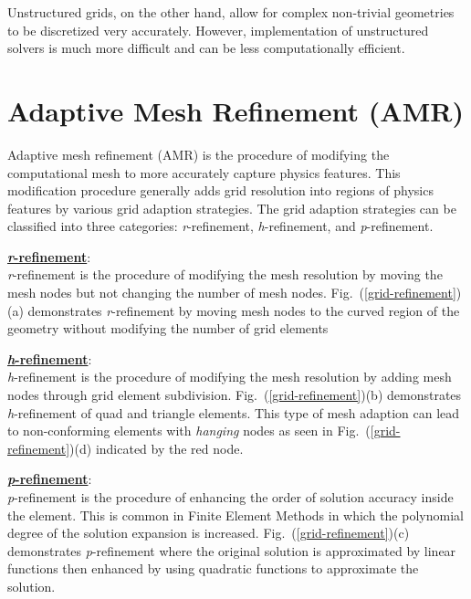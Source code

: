 \documentclass[11pt]{book}
\begin{document}
Unstructured grids, on the other hand, allow for complex non-trivial geometries to be discretized very accurately. 
However, implementation of unstructured solvers is much more difficult and can be less computationally efficient.

\newpage
\section{Adaptive Mesh Refinement (AMR)}
Adaptive mesh refinement (AMR) is the procedure of modifying the computational mesh to more accurately capture physics features.
This modification procedure generally adds grid resolution into regions of physics features by various grid adaption strategies.
The grid adaption strategies can be classified into three categories: \textit{r}-refinement, \textit{h}-refinement, and \textit{p}-refinement.
\bigskip

\noindent
\underline{\textbf{\textit{r}-refinement}}:\\
\textit{r}-refinement is the procedure of modifying the mesh resolution by moving the mesh nodes but not changing the number of mesh nodes. 
Fig.~(\ref{grid-refinement})(a) demonstrates \textit{r}-refinement by moving mesh nodes to the curved region of the geometry without modifying 
the number of grid elements
\bigskip

\noindent
\underline{\textbf{\textit{h}-refinement}}:\\
\textit{h}-refinement is the procedure of modifying the mesh resolution by adding mesh nodes through grid element subdivision.
Fig.~(\ref{grid-refinement})(b) demonstrates \textit{h}-refinement of quad and triangle elements. This type of mesh adaption 
can lead to non-conforming elements with \textit{hanging} nodes as seen in Fig.~(\ref{grid-refinement})(d) indicated by the red node.
\bigskip

\noindent
\underline{\textbf{\textit{p}-refinement}}:\\
\textit{p}-refinement is the procedure of enhancing the order of solution accuracy inside the element.
This is common in Finite Element Methods in which the polynomial degree of the solution expansion is increased.
Fig.~(\ref{grid-refinement})(c) demonstrates \textit{p}-refinement where the original solution is approximated 
by linear functions then enhanced by using quadratic functions to approximate the solution.
\end{document}
